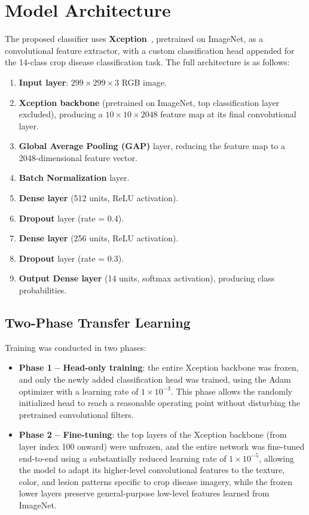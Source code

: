 \documentclass[12pt,a4paper,oneside]{report}
\begin{document}
\section{Model Architecture}
\label{sec:model_architecture}
The proposed classifier uses \textbf{Xception}~\cite{chollet2017xception}, pretrained on ImageNet, as a
convolutional feature extractor, with a custom classification head appended for the 14-class crop disease
classification task. The full architecture is as follows:
\begin{enumerate}
    \item \textbf{Input layer}: $299 \times 299 \times 3$ RGB image.
    \item \textbf{Xception backbone} (pretrained on ImageNet, top classification layer excluded), producing a
          $10 \times 10 \times 2048$ feature map at its final convolutional layer.
    \item \textbf{Global Average Pooling (GAP)} layer, reducing the feature map to a 2048-dimensional feature
          vector.
    \item \textbf{Batch Normalization} layer.
    \item \textbf{Dense layer} (512 units, ReLU activation).
    \item \textbf{Dropout} layer (rate = 0.4).
    \item \textbf{Dense layer} (256 units, ReLU activation).
    \item \textbf{Dropout} layer (rate = 0.3).
    \item \textbf{Output Dense layer} (14 units, softmax activation), producing class probabilities.
\end{enumerate}

\subsection{Two-Phase Transfer Learning}
Training was conducted in two phases:
\begin{itemize}
    \item \textbf{Phase 1 -- Head-only training}: the entire Xception backbone was frozen, and only the newly
          added classification head was trained, using the Adam optimizer with a learning rate of $1 \times
          10^{-3}$. This phase allows the randomly initialized head to reach a reasonable operating point without
          disturbing the pretrained convolutional filters.
    \item \textbf{Phase 2 -- Fine-tuning}: the top layers of the Xception backbone (from layer index 100 onward)
          were unfrozen, and the entire network was fine-tuned end-to-end using a substantially reduced learning
          rate of $1 \times 10^{-5}$, allowing the model to adapt its higher-level convolutional features to the
          texture, color, and lesion patterns specific to crop disease imagery, while the frozen lower layers
          preserve general-purpose low-level features learned from ImageNet.
\end{itemize}
\end{document}
